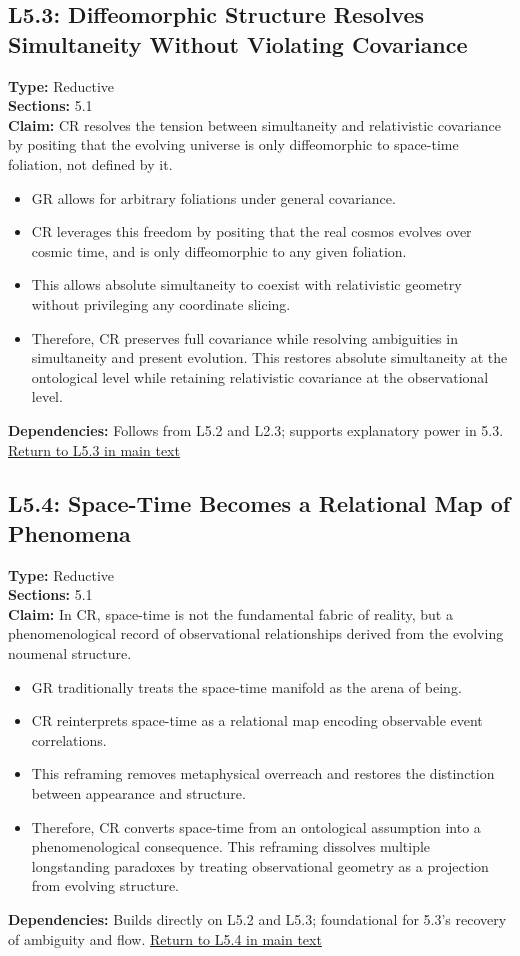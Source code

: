 \documentclass[12pt]{book}
\newcommand{\returnlink}[1]{\hyperref[logic:#1]{Return to #1 in main text}\xspace}
\begin{document}
\subsection*{L5.3: Diffeomorphic Structure Resolves Simultaneity Without Violating Covariance}
\label{appendix:L5.3}
\textbf{Type:} Reductive \\
\textbf{Sections:} 5.1 \\
\textbf{Claim:} CR resolves the tension between simultaneity and relativistic covariance by positing that the evolving universe is only diffeomorphic to space-time foliation, not defined by it.
\begin{itemize}
  \item GR allows for arbitrary foliations under general covariance.
  \item CR leverages this freedom by positing that the real cosmos evolves over cosmic time, and is only diffeomorphic to any given foliation.
  \item This allows absolute simultaneity to coexist with relativistic geometry without privileging any coordinate slicing.
  \item Therefore, CR preserves full covariance while resolving ambiguities in simultaneity and present evolution. This restores absolute simultaneity at the ontological level while retaining relativistic covariance at the observational level.
\end{itemize}
\textbf{Dependencies:} Follows from L5.2 and L2.3; supports explanatory power in 5.3.
\returnlink{L5.3}

\subsection*{L5.4: Space-Time Becomes a Relational Map of Phenomena}
\label{appendix:L5.4}
\textbf{Type:} Reductive \\
\textbf{Sections:} 5.1 \\
\textbf{Claim:} In CR, space-time is not the fundamental fabric of reality, but a phenomenological record of observational relationships derived from the evolving noumenal structure.
\begin{itemize}
  \item GR traditionally treats the space-time manifold as the arena of being.
  \item CR reinterprets space-time as a relational map encoding observable event correlations.
  \item This reframing removes metaphysical overreach and restores the distinction between appearance and structure.
  \item Therefore, CR converts space-time from an ontological assumption into a phenomenological consequence. This reframing dissolves multiple longstanding paradoxes by treating observational geometry as a projection from evolving structure.
\end{itemize}
\textbf{Dependencies:} Builds directly on L5.2 and L5.3; foundational for 5.3's recovery of ambiguity and flow.
\returnlink{L5.4}
\end{document}
